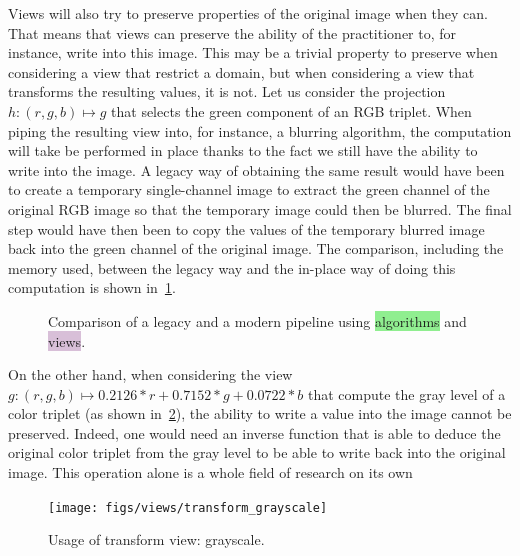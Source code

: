Views will also try to preserve properties of the original image when they can. That means that views can preserve the
ability of the practitioner to, for instance, write into this image. This may be a trivial property to preserve when
considering a view that restrict a domain, but when considering a view that transforms the resulting values, it is not.
Let us consider the projection $h: (r,g,b) \mapsto g$ that selects the green component of an RGB triplet. When piping
the resulting view into, for instance, a blurring algorithm, the computation will take be performed in place thanks to
the fact we still have the ability to write into the image. A legacy way of obtaining the same result would have been to
create a temporary single-channel image to extract the green channel of the original RGB image so that the temporary
image could then be blurred. The final step would have then been to copy the values of the temporary blurred image back
into the green channel of the original image. The comparison, including the memory used, between the legacy way and the
in-place way of doing this computation is shown in~\cref{fig.legacy.vs.view}.

\begin{figure}[htbp]
  \centering
  \hfil

  \caption{Comparison of a legacy and a modern pipeline using \colorbox{lightgreen}{algorithms} and
    \colorbox{thistle}{views}.}
  \label{fig.legacy.vs.view}
\end{figure}

On the other hand, when considering the view $g: (r,g,b) \mapsto 0.2126*r+0.7152*g+0.0722*b$ that compute the gray level
of a color triplet (as shown in~\cref{fig.view.grayscale}), the ability to write a value into the image cannot be
preserved. Indeed, one would need an inverse function that is able to deduce the original color triplet from the gray
level to be able to write back into the original image. This operation alone is a whole field of research on its
own~\parencite{zhang.2016.colorful,levin.2004.colorization,welsh.2002.transferring}

\begin{figure}[htbp]
  \centering
  \texttt{[image: figs/views/transform\_grayscale]}
  \caption{Usage of transform view: grayscale.}
  \label{fig.view.grayscale}
\end{figure}

